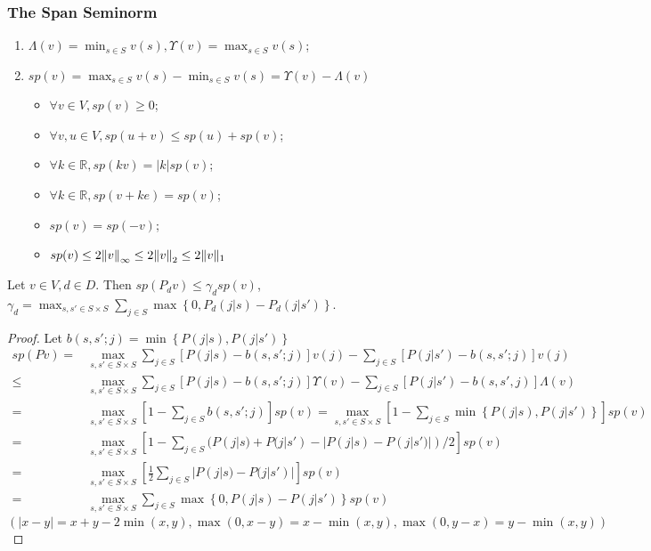 \subsubsection{The Span Seminorm}%

\begin{enumerate}
    \item $ \Lambda(v) = \min_{s \in S} v(s), \Upsilon(v) = \max_{s \in S} v(s) $;
    \item $ sp(v) = \max_{s \in S} v(s) - \min_{s \in S}v(s) = \Upsilon(v) - \Lambda(v) $
        \begin{itemize}
            \item $ \forall v \in V, sp(v) \ge 0 $;
            \item $ \forall v, u \in V, sp(u+v) \le sp(u) + sp(v) $;
            \item $ \forall k \in \mathbb{R}, sp(kv) = |k| sp(v) $;
            \item $ \forall k \in \mathbb{R}, sp(v+ke) = sp(v) $;
            \item $ sp(v) = sp(-v) $;
            \item $ sp(v) \le 2 {\Arrowvert v \Arrowvert}_\infty \le 2 {\Arrowvert v \Arrowvert}_2 \le 2 \Arrowvert v \Arrowvert_1 $
        \end{itemize}
\end{enumerate}

\begin{proposition}
    Let $ v \in V, d \in D $. Then $ sp(P_d v) \le \gamma_d sp(v) $,\\
    $ \gamma_d = \max_{s, s' \in S \times S} \sum^{}_{j \in S} \max \left\{0, P_d(j |s) - P_d(j | s') \right\}$.
    \begin{proof}
        Let $ b(s, s'; j) = \min \left\{ P(j | s), P(j | s') \right\} $
        \begin{align*}
            sp(Pv) =& \max_{s, s' \in S \times S}\sum^{}_{j \in S} [P(j | s) - b(s, s';j)] v(j) - \sum^{}_{j \in S} [P(j | s') - b(s, s';j)] v(j)\\
            \le& \max_{s, s' \in S \times S}\sum^{}_{j\in S}[P(j|s) - b(s, s';j)] \Upsilon(v) - \sum^{}_{j\in S} [P(j|s') - b(s,s',j)]\Lambda(v)\\
            =& \max_{s, s' \in S \times S} \left[ 1 - \sum^{}_{j\in S} b(s, s'; j)\right] sp(v)
            = \max_{s, s' \in S \times S} \left[1 - \sum^{}_{j \in S} \min\left\{ P(j|s), P(j|s') \right\}\right] sp(v)\\
            =& \max_{s, s' \in S \times S} \left[ 1 - \sum^{}_{j\in S} (P(j|s) + P(j|s') - |P(j|s)-P(j|s')|)/2 \right] sp(v)\\
            =& \max_{s, s' \in S \times S} \left[ \frac{1}{2} \sum^{}_{j\in S} |P(j|s)-P(j|s')| \right] sp(v)\\
            =& \max_{s, s' \in S \times S} \sum^{}_{j\in S} \max\left\{ 0, P(j|s) - P(j|s') \right\} sp(v)
        \end{align*}
        $ (\left| x - y \right| = x+y - 2\min(x,y), \max(0, x-y) = x - \min(x,y), \max(0, y-x) = y - \min(x,y))$
    \end{proof}
\end{proposition}

